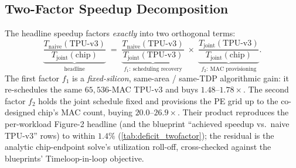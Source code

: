 \subsection{Two-Factor Speedup Decomposition}
\label{app:deficit:twofactor}

The headline speedup factors \emph{exactly} into two orthogonal terms:
\begin{equation}
\underbrace{\frac{T_{\mathrm{naive}}(\text{TPU-v3})}{T_{\mathrm{joint}}(\text{chip})}}_{\text{headline}}
\;=\;
\underbrace{\frac{T_{\mathrm{naive}}(\text{TPU-v3})}{T_{\mathrm{joint}}(\text{TPU-v3})}}_{f_1:\ \text{scheduling recovery}}
\;\times\;
\underbrace{\frac{T_{\mathrm{joint}}(\text{TPU-v3})}{T_{\mathrm{joint}}(\text{chip})}}_{f_2:\ \text{MAC provisioning}} .
\label{eq:twofactor}
\end{equation}
The first factor $f_1$ is a \emph{fixed-silicon}, same-area / same-TDP
algorithmic gain: it re-schedules the same $65{,}536$-MAC TPU-v3 and buys
$\mathbf{1.48}$--$\mathbf{1.78\times}$. The second factor $f_2$ holds the joint
schedule fixed and provisions the PE grid up to the co-designed chip's MAC
count, buying $\mathbf{20.0}$--$\mathbf{26.9\times}$. Their product reproduces
the per-workload Figure-2 headline (and the blueprint ``achieved speedup vs.\
naive TPU-v3'' rows) to within $1.4\%$
(\cref{tab:deficit_twofactor}); the residual is the analytic
chip-endpoint solve's utilization roll-off, cross-checked against the
blueprints' Timeloop-in-loop objective.

